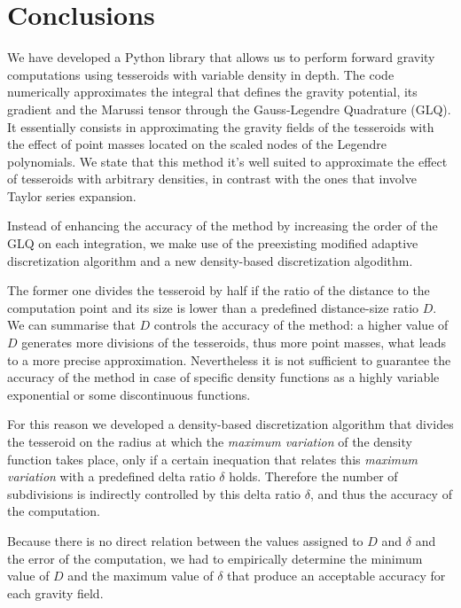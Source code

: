 \documentclass[extra]{gji}
\begin{document}

\section{Conclusions}

We have developed a Python library that allows us to perform forward gravity computations using tesseroids with variable density in depth.
The code numerically approximates the integral that defines the gravity potential, its gradient and the Marussi tensor through the Gauss-Legendre Quadrature (GLQ).
It essentially consists in approximating the gravity fields of the tesseroids with the effect of point masses located on the scaled nodes of the Legendre polynomials.
We state that this method it's well suited to approximate the effect of tesseroids with arbitrary densities, in contrast with the ones that involve Taylor series expansion.

Instead of enhancing the accuracy of the method by increasing the order of the GLQ on each integration, we make use of the preexisting modified adaptive discretization algorithm and a new density-based discretization algodithm.

The former one divides the tesseroid by half if the ratio of the distance to the computation point and its size is lower than a predefined distance-size ratio $D$.
We can summarise that $D$ controls the accuracy of the method: a higher value of $D$ generates more divisions of the tesseroids, thus more point masses, what leads to a more precise approximation.
Nevertheless it is not sufficient to guarantee the accuracy of the method in case of specific density functions as a highly variable exponential or some discontinuous functions.

For this reason we developed a density-based discretization algorithm that divides the tesseroid on the radius at which the \emph{maximum variation} of the density function takes place, only if a certain inequation that relates this \emph{maximum variation} with a predefined delta ratio $\delta$ holds.
Therefore the number of subdivisions is indirectly controlled by this delta ratio $\delta$, and thus the accuracy of the computation.

Because there is no direct relation between the values assigned to $D$ and $\delta$ and the error of the computation, we had to empirically determine the minimum value of $D$ and the maximum value of $\delta$ that produce an acceptable accuracy for each gravity field.
\end{document}
